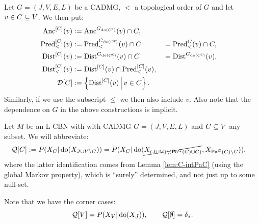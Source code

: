 \begin{Not}
    Let $G=(J,V,E,L)$  be a CADMG, $<$ a topological order of $G$ and let $v \in C \subseteq V$.
    We then put:
    \begin{align*}
        \mathrm{Anc}^{[C]}(v) &:= \mathrm{Anc}^{G_{\operatorname{do}(C^{\mathsf{c}})}}(v) \cap C, \\
        \mathrm{Pred}^{[C]}_<(v)&:= \mathrm{Pred}_<^{G_{\operatorname{do}(C^{\mathsf{c}})}}(v) \cap C &&= \mathrm{Pred}_<^{G}(v) \cap C, \\
        \mathrm{Dist}^{[C]}(v)&:= \mathrm{Dist}^{G_{\operatorname{do}(C^{\mathsf{c}})}}(v) \cap C &&= \mathrm{Dist}^{G_{\operatorname{do}(C^{\mathsf{c}})}}(v) , \\
        \mathrm{Dist}^{[C]}_<(v)&:= \mathrm{Dist}^{[C]}(v) \cap \mathrm{Pred}^{[C]}_<(v), \\
        \mathcal{D}[C] &:= \left \{ \mathrm{Dist}^{[C]}(v) \,\middle|\, v \in C \right \}.
    \end{align*}
    Similarly, if we use the subscript $\le$ we then also include $v$.
    Also note that the dependence on $G$ in the above constructions is implicit.
\end{Not}



\begin{Not}
     Let $M$ be an L-CBN with with \observational CADMG $G=(J,V,E,L)$ and $C \subseteq V$ any subset.
     We will abbreviate:
    \begin{align*} \mathcal{Q}[C] 
        &:= P(X_C|\operatorname{do}(X_{J \cup V \setminus C})) 
        = P(X_C|\operatorname{do}(\cancel{X_{(J \cup V) \setminus (\mathrm{Pa}^G(C) \cup C)}}, X_{\mathrm{Pa}^G(C)\setminus C})),
    \end{align*}
    where the latter identification comes from Lemma \ref{lem:C-intPaC} (using the global Markov property), which is 
    ``surely'' determined, and not just up to some null-set.
    
    Note that we have the corner cases:
    \[ \mathcal{Q}[V]=P(X_V|\operatorname{do}(X_J)), \qquad \mathcal{Q}[\emptyset]=\delta_\ast.  \]
\end{Not}



